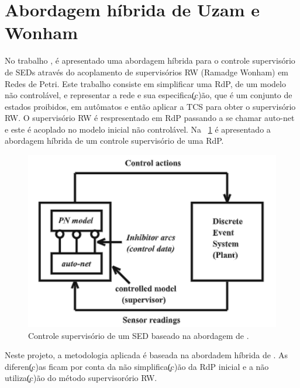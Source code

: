 \section{Abordagem h\'ibrida de Uzam e Wonham}

No trabalho \cite{UzamWonham2005}, \'e apresentado uma abordagem h\'ibrida para o controle supervis\'orio de SEDs atrav\'es do acoplamento de supervis\'orios RW (Ramadge Wonham) em Redes de Petri. Este trabalho consiste em simplificar uma RdP, de um modelo n\~ao control\'avel, e representar a rede e sua especifica\c(c)\~ao, que \'e um conjunto de estados proibidos, em aut\^omatos e ent\~ao aplicar a TCS para obter o supervis\'orio RW. O supervis\'orio RW \'e respresentado em RdP passando a se chamar auto-net e este \'e acoplado no modelo inicial n\~ao control\'avel. Na ~\ref{fig:uzamcontrol} \'e apresentado a abordagem h\'ibrida de um controle supervis\'orio de uma RdP.

\begin{figure}[!htb]
	\caption[Controle supervis\'orio de um SED baseado na abordagem de \cite{UzamWonham2005}.]{Controle supervis\'orio de um SED baseado na abordagem de \cite{UzamWonham2005}.}
	\label{fig:uzamcontrol}
	\includegraphics[width=16cm]{./figuras/UZAMCONTROL.png}\centering
\end{figure}

Neste projeto, a metodologia aplicada \'e baseada na abordadem h\'ibrida de \cite{UzamWonham2005}. As diferen\c(c)as ficam por conta da n\~ao simplifica\c(c)\~ao da RdP inicial e a n\~ao utiliza\c(c)\~ao do m\'etodo supervisor\'orio RW.




